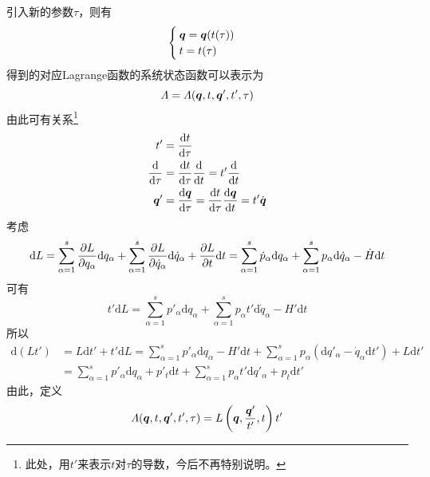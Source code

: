 引入新的参数$\tau$，则有
\begin{equation*}
	\begin{cases}
		\boldsymbol{q} = \boldsymbol{q}(t(\tau)) \\
		t = t(\tau)
	\end{cases}
\end{equation*}
得到的对应Lagrange函数的系统状态函数可以表示为
\begin{equation*}
	\varLambda = \varLambda(\boldsymbol{q},t,\boldsymbol{q}',t',\tau)
\end{equation*}
由此可有关系\footnote{此处，用$t'$来表示$t$对$\tau$的导数，今后不再特别说明。}
\begin{align*}
	t' &= \frac{\mathrm{d} t}{\mathrm{d} \tau} \\
	\frac{\mathrm{d}}{\mathrm{d} \tau} & = \frac{\mathrm{d} t}{\mathrm{d} \tau} \frac{\mathrm{d}}{\mathrm{d} t} = t' \frac{\mathrm{d}}{\mathrm{d} t} \\
	\boldsymbol{q}' &= \frac{\mathrm{d} \boldsymbol{q}}{\mathrm{d} \tau} = \frac{\mathrm{d} t}{\mathrm{d} \tau} \frac{\mathrm{d} \boldsymbol{q}}{\mathrm{d} t} = t' \dot{\boldsymbol{q}}
\end{align*}
考虑
\begin{equation*}
	\mathrm{d} L = \sum_{\alpha=1}^s \frac{\partial L}{\partial q_\alpha} \mathrm{d} q_\alpha + \sum_{\alpha=1}^s \frac{\partial L}{\partial \dot{q}_\alpha} \mathrm{d} \dot{q}_\alpha + \frac{\partial L}{\partial t} \mathrm{d} t = \sum_{\alpha=1}^s \dot{p}_\alpha \mathrm{d} q_\alpha + \sum_{\alpha=1}^s p_\alpha \mathrm{d} \dot{q}_\alpha - \dot{H} \mathrm{d} t
\end{equation*}
可有
\begin{equation*}
	t'\mathrm{d} L = \sum_{\alpha=1}^s p'_\alpha \mathrm{d} q_\alpha + \sum_{\alpha=1}^s p_\alpha t' \mathrm{d} \dot{q}_\alpha - H' \mathrm{d} t
\end{equation*}
所以
\begin{align}
	\mathrm{d} (Lt') & = L\mathrm{d} t' + t'\mathrm{d} L = \sum_{\alpha=1}^s p'_\alpha \mathrm{d} q_\alpha - H' \mathrm{d} t + \sum_{\alpha=1}^s p_\alpha (\mathrm{d} q'_\alpha - \dot{q}_\alpha \mathrm{d} t') + L\mathrm{d} t' \nonumber \\
	& = \sum_{\alpha=1}^s p'_\alpha \mathrm{d} q_\alpha + p'_t \mathrm{d} t + \sum_{\alpha=1}^s p_\alpha t' \mathrm{d} q'_\alpha + p_t\mathrm{d} t'
	\label{推广的Lagrange函数中间步骤}
\end{align}
由此，定义
\begin{equation}
	\mathnormal{\Lambda}(\boldsymbol{q},t,\boldsymbol{q}',t',\tau) = L \left(\boldsymbol{q},\frac{\boldsymbol{q}'}{t'},t\right) t'
\end{equation}
